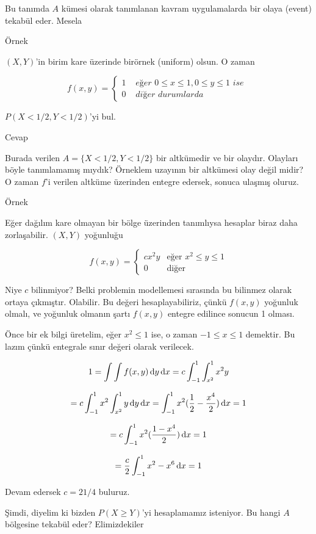 \documentclass[12pt,fleqn]{article}\usepackage{../../common}
\begin{document}
Bu tanımda $A$ kümesi olarak tanımlanan kavram uygulamalarda bir olaya
(event) tekabül eder. Mesela

Örnek

$(X,Y)$'in birim kare üzerinde birörnek (uniform) olsun. O zaman 

$$ 
f(x,y) =
\left\{ \begin{array}{ll}
1 & \textit{ eğer }  0 \le x \le 1, 0 \le y \le 1  \textit{ ise }\\
0 & \textit{ diğer durumlarda }
\end{array} \right.
 $$

$P(X < 1/2, Y < 1/2)$'yi bul. 

Cevap

Burada verilen $A = \{ X < 1/2, Y < 1/2\}$ bir altkümedir ve bir
olaydır. Olayları böyle tanımlamamış mıydık? Örneklem uzayının bir
altkümesi olay değil midir? O zaman $f$'i verilen altküme üzerinden entegre
edersek, sonuca ulaşmış oluruz. 

Örnek 

Eğer dağılım kare olmayan bir bölge üzerinden tanımlıysa hesaplar biraz
daha zorlaşabilir. $(X,Y)$ yoğunluğu 

$$ 
f(x,y) = 
\left\{ \begin{array}{ll}
cx^2y & \textrm{eğer } x^2 \le y \le 1 \\
0 & \textrm{diğer}
\end{array} \right.
 $$

Niye $c$ bilinmiyor? Belki problemin modellemesi sırasında bu bilinmez
olarak ortaya çıkmıştır. Olabilir. Bu değeri hesaplayabiliriz, çünkü
$f(x,y)$ yoğunluk olmalı, ve yoğunluk olmanın şartı $f(x,y)$ entegre
edilince sonucun 1 olması. 

Önce bir ek bilgi üretelim, eğer $x^2 \le 1$ ise, o zaman $-1 \le x \le 1$ 
demektir. Bu lazım çünkü entegrale sınır değeri olarak verilecek. 

$$ 1 = \int  \int f(x,y) \,\mathrm{d} y \,\mathrm{d} x = c \int _{ -1}^{1} \int _{ x^2}^{1}x^2y  $$

$$
=  c \int _{ -1}^{1} x^2 \int _{ x^2}^{1} y \,\mathrm{d} y \,\mathrm{d} x = 
\int _{ -1}^{1} x^2 (\frac{ 1}{2} - \frac{ x^4}{2} ) \,\mathrm{d} x = 1
$$

$$ = c \int _{ -1}^{1} x^2 (\frac{ 1 - x^4}{2} ) \,\mathrm{d} x = 1 $$

$$ = \frac{ c}{2} \int _{ -1}^{1} x^2 - x^6 \,\mathrm{d} x  = 1$$

Devam edersek $c = 21/4$ buluruz. 

Şimdi, diyelim ki bizden $P(X \ge Y)$'yi hesaplamamız isteniyor. Bu hangi
$A$ bölgesine tekabül eder? Elimizdekiler
\end{document}
